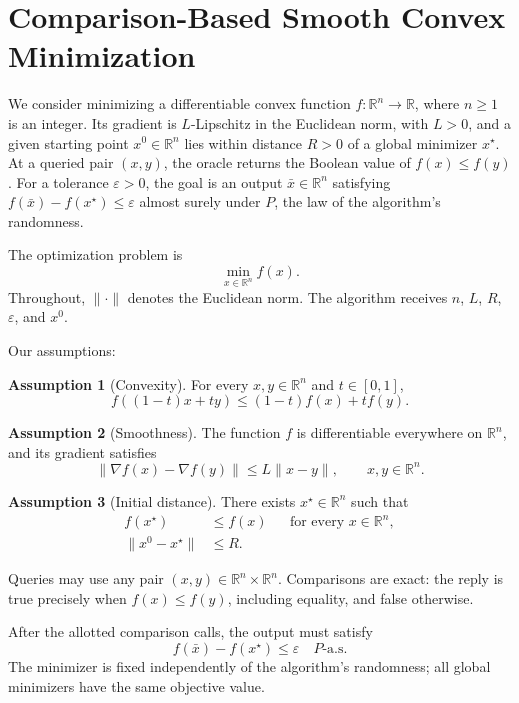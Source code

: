 \documentclass[10pt]{article}
\theoremstyle{definition}
\newtheorem{assumption}{Assumption}
\begin{document}
\section*{Comparison-Based Smooth Convex Minimization}
We consider minimizing a differentiable convex function $f:\mathbb{R}^n\to\mathbb{R}$, where $n\geq 1$ is an integer. Its gradient is $L$-Lipschitz in the Euclidean norm, with $L>0$, and a given starting point $x^0\in\mathbb{R}^n$ lies within distance $R>0$ of a global minimizer $x^\star$. At a queried pair $(x,y)$, the oracle returns the Boolean value of $f(x)\leq f(y)$. For a tolerance $\varepsilon>0$, the goal is an output $\bar{x}\in\mathbb{R}^n$ satisfying $f(\bar{x})-f(x^\star)\leq\varepsilon$ almost surely under $P$, the law of the algorithm's randomness.

The optimization problem is
\[
\min_{x\in\mathbb{R}^n} f(x).
\]
Throughout, $\|\cdot\|$ denotes the Euclidean norm. The algorithm receives $n$, $L$, $R$, $\varepsilon$, and $x^0$.

Our assumptions:
\begin{assumption}[Convexity]
For every $x,y\in\mathbb{R}^n$ and $t\in[0,1]$,
\[
f((1-t)x+ty)\leq (1-t)f(x)+t f(y).
\]
\end{assumption}

\begin{assumption}[Smoothness]
The function $f$ is differentiable everywhere on $\mathbb{R}^n$, and its gradient satisfies
\[
\|\nabla f(x)-\nabla f(y)\|\leq L\|x-y\|,
\qquad x,y\in\mathbb{R}^n.
\]
\end{assumption}

\begin{assumption}[Initial distance]
There exists $x^\star\in\mathbb{R}^n$ such that
\[
\begin{aligned}
f(x^\star)&\leq f(x) &&\text{for every }x\in\mathbb{R}^n,\\
\|x^0-x^\star\|&\leq R.
\end{aligned}
\]
\end{assumption}

Queries may use any pair $(x,y)\in\mathbb{R}^n\times\mathbb{R}^n$. Comparisons are exact: the reply is true precisely when $f(x)\leq f(y)$, including equality, and false otherwise.

After the allotted comparison calls, the output must satisfy
\[
f(\bar{x})-f(x^\star)\leq\varepsilon
\quad P\text{-a.s.}
\]
The minimizer is fixed independently of the algorithm's randomness; all global minimizers have the same objective value.
\end{document}
